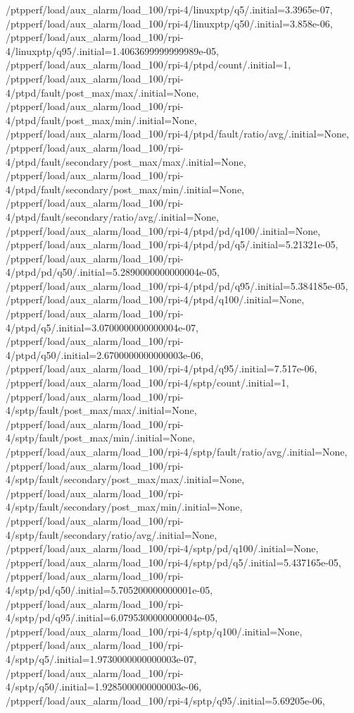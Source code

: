 {    /ptpperf/load/aux_alarm/load_100/rpi-4/linuxptp/q5/.initial=3.3965e-07,
    /ptpperf/load/aux_alarm/load_100/rpi-4/linuxptp/q50/.initial=3.858e-06,
    /ptpperf/load/aux_alarm/load_100/rpi-4/linuxptp/q95/.initial=1.4063699999999989e-05,
    /ptpperf/load/aux_alarm/load_100/rpi-4/ptpd/count/.initial=1,
    /ptpperf/load/aux_alarm/load_100/rpi-4/ptpd/fault/post_max/max/.initial=None,
    /ptpperf/load/aux_alarm/load_100/rpi-4/ptpd/fault/post_max/min/.initial=None,
    /ptpperf/load/aux_alarm/load_100/rpi-4/ptpd/fault/ratio/avg/.initial=None,
    /ptpperf/load/aux_alarm/load_100/rpi-4/ptpd/fault/secondary/post_max/max/.initial=None,
    /ptpperf/load/aux_alarm/load_100/rpi-4/ptpd/fault/secondary/post_max/min/.initial=None,
    /ptpperf/load/aux_alarm/load_100/rpi-4/ptpd/fault/secondary/ratio/avg/.initial=None,
    /ptpperf/load/aux_alarm/load_100/rpi-4/ptpd/pd/q100/.initial=None,
    /ptpperf/load/aux_alarm/load_100/rpi-4/ptpd/pd/q5/.initial=5.21321e-05,
    /ptpperf/load/aux_alarm/load_100/rpi-4/ptpd/pd/q50/.initial=5.2890000000000004e-05,
    /ptpperf/load/aux_alarm/load_100/rpi-4/ptpd/pd/q95/.initial=5.384185e-05,
    /ptpperf/load/aux_alarm/load_100/rpi-4/ptpd/q100/.initial=None,
    /ptpperf/load/aux_alarm/load_100/rpi-4/ptpd/q5/.initial=3.0700000000000004e-07,
    /ptpperf/load/aux_alarm/load_100/rpi-4/ptpd/q50/.initial=2.6700000000000003e-06,
    /ptpperf/load/aux_alarm/load_100/rpi-4/ptpd/q95/.initial=7.517e-06,
    /ptpperf/load/aux_alarm/load_100/rpi-4/sptp/count/.initial=1,
    /ptpperf/load/aux_alarm/load_100/rpi-4/sptp/fault/post_max/max/.initial=None,
    /ptpperf/load/aux_alarm/load_100/rpi-4/sptp/fault/post_max/min/.initial=None,
    /ptpperf/load/aux_alarm/load_100/rpi-4/sptp/fault/ratio/avg/.initial=None,
    /ptpperf/load/aux_alarm/load_100/rpi-4/sptp/fault/secondary/post_max/max/.initial=None,
    /ptpperf/load/aux_alarm/load_100/rpi-4/sptp/fault/secondary/post_max/min/.initial=None,
    /ptpperf/load/aux_alarm/load_100/rpi-4/sptp/fault/secondary/ratio/avg/.initial=None,
    /ptpperf/load/aux_alarm/load_100/rpi-4/sptp/pd/q100/.initial=None,
    /ptpperf/load/aux_alarm/load_100/rpi-4/sptp/pd/q5/.initial=5.437165e-05,
    /ptpperf/load/aux_alarm/load_100/rpi-4/sptp/pd/q50/.initial=5.705200000000001e-05,
    /ptpperf/load/aux_alarm/load_100/rpi-4/sptp/pd/q95/.initial=6.0795300000000004e-05,
    /ptpperf/load/aux_alarm/load_100/rpi-4/sptp/q100/.initial=None,
    /ptpperf/load/aux_alarm/load_100/rpi-4/sptp/q5/.initial=1.9730000000000003e-07,
    /ptpperf/load/aux_alarm/load_100/rpi-4/sptp/q50/.initial=1.9285000000000003e-06,
    /ptpperf/load/aux_alarm/load_100/rpi-4/sptp/q95/.initial=5.69205e-06,
}
